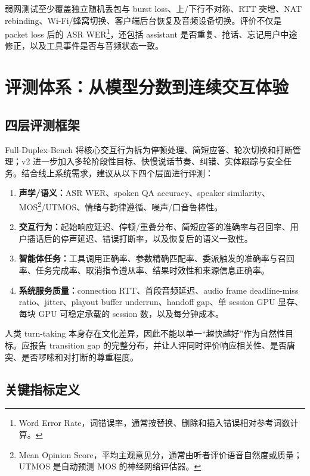\documentclass[UTF8,fontset=none,a4paper,10pt]{ctexart}
\begin{document}
弱网测试至少覆盖独立随机丢包与 burst loss、上/下行不对称、RTT 突增、NAT rebinding、Wi-Fi/蜂窝切换、客户端后台恢复及音频设备切换。评价不仅是 packet loss 后的 ASR WER\footnote{Word Error Rate，词错误率，通常按替换、删除和插入错误相对参考词数计算。}，还包括 assistant 是否重复、抢话、忘记用户中途修正，以及工具事件是否与音频状态一致。

\section{评测体系：从模型分数到连续交互体验}

\subsection{四层评测框架}

Full-Duplex-Bench 将核心交互行为拆为停顿处理、简短应答、轮次切换和打断管理\cite{lin2025fullduplexbench}；v2 进一步加入多轮阶段性目标、快慢说话节奏、纠错、实体跟踪与安全任务\cite{lin2026fullduplexbenchv2}。结合线上系统需求，建议从以下四个层面进行评测：

\begin{enumerate}
  \item \textbf{声学/语义：}ASR WER、spoken QA accuracy、speaker similarity、MOS\footnote{Mean Opinion Score，平均主观意见分，通常由听者评价语音自然度或质量；UTMOS 是自动预测 MOS 的神经网络评估器。}/UTMOS、情绪与韵律遵循、噪声/口音鲁棒性。
  \item \textbf{交互行为：}起始响应延迟、停顿/重叠分布、简短应答的准确率与召回率、用户插话后的停声延迟、错误打断率，以及恢复后的语义一致性。
  \item \textbf{智能体任务：}工具调用正确率、参数精确匹配率、委派触发的准确率与召回率、任务完成率、取消指令遵从率、结果时效性和来源信息正确率。
  \item \textbf{系统服务质量：}connection RTT、首段音频延迟、audio frame deadline-miss ratio、jitter、playout buffer underrun、handoff gap、单 session GPU 显存、每块 GPU 可稳定承载的 session 数，以及每分钟成本。
\end{enumerate}

人类 turn-taking 本身存在文化差异\cite{stivers2009turntaking}，因此不能以单一“越快越好”作为自然性目标。应报告 transition gap 的完整分布，并让人评同时评价响应相关性、是否唐突、是否啰嗦和对打断的尊重程度。

\subsection{关键指标定义}
\end{document}
